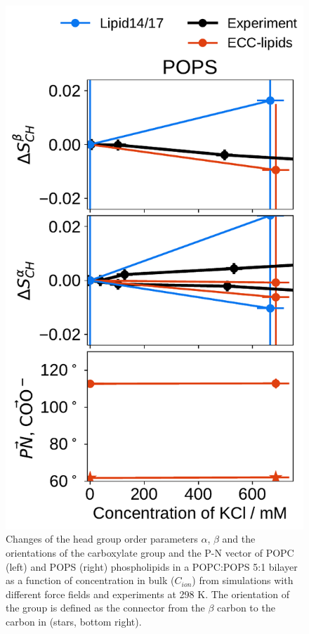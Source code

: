 \begin{figure}[tbp!]
  \includegraphics[width=\figwidthsmall]{../img/ecc_pops/order_parameters_changes_ecc-lip_L14_A-B-PN-COO_POPS_kcl.pdf} 
  \caption{\label{fig:delta_ordPar_KCl} 
    Changes of the head group order parameters $\alpha$, $\beta$ and the orientations of the carboxylate group and the P-N vector  
    of POPC (left) and POPS (right) phospholipids in a POPC:POPS 5:1 bilayer as a function of  concentration 
    in bulk ($C_{ion}$) from simulations with different force fields and experiments at 298 K. \citep{roux90}
    The orientation of the  group is defined as 
    the connector from the $\beta$ carbon to the carbon in  (stars, bottom right). 
  } 
\end{figure} 
 


